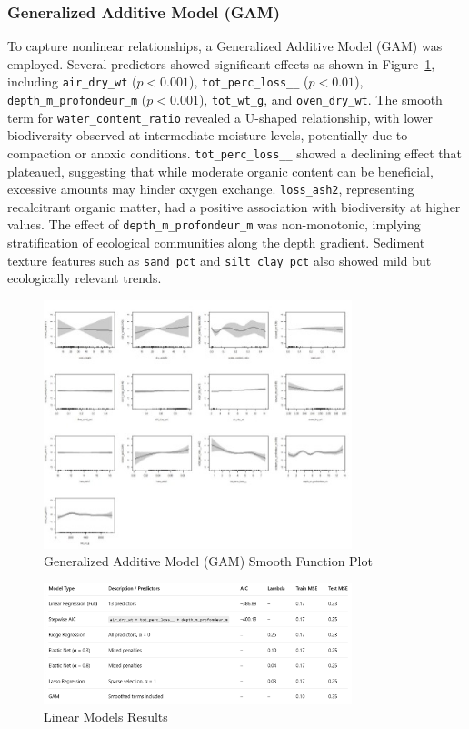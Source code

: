 \documentclass[12pt]{article}
\begin{document}
\subsubsection{Generalized Additive Model (GAM)}

\qquad To capture nonlinear relationships, a Generalized Additive Model (GAM)
was employed. Several predictors showed significant effects as shown in
Figure~\ref{fig:gam-smooth}, including \texttt{air\_dry\_wt} ($p < 0.001$),
\texttt{tot\_perc\_loss\_\_} ($p < 0.01$), \texttt{depth\_m\_profondeur\_m} ($p
< 0.001$), \texttt{tot\_wt\_g}, and \texttt{oven\_dry\_wt}. The smooth term for
\texttt{water\_content\_ratio} revealed a U-shaped relationship, with lower
biodiversity observed at intermediate moisture levels, potentially due to
compaction or anoxic conditions. \texttt{tot\_perc\_loss\_\_} showed a declining
effect that plateaued, suggesting that while moderate organic content can be
beneficial, excessive amounts may hinder oxygen exchange. \texttt{loss\_ash2},
representing recalcitrant organic matter, had a positive association with
biodiversity at higher values. The effect of \texttt{depth\_m\_profondeur\_m}
was non-monotonic, implying stratification of ecological communities along the
depth gradient. Sediment texture features such as \texttt{sand\_pct} and
\texttt{silt\_clay\_pct} also showed mild but ecologically relevant trends.

\begin{figure}[H]
\centering
\includegraphics[width=0.8\textwidth]{GAM-smooth-function-plot.jpg}
\caption{Generalized Additive Model (GAM) Smooth Function Plot}
\label{fig:gam-smooth}
\end{figure}

\begin{figure}[H]
\centering
\includegraphics[width=0.8\textwidth]{linear-models.png}
\caption{Linear Models Results}
\label{fig:linear-models}
\end{figure}
\end{document}
